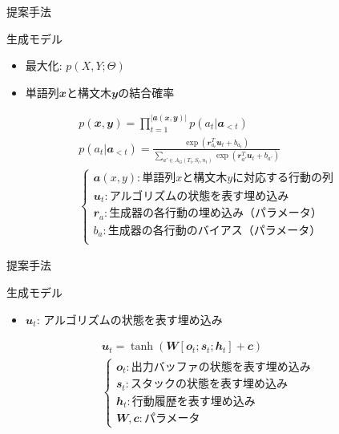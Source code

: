 \documentclass[aspectratio=43,unicode,10pt]{beamer}
\newcommand{\mb}{\mathbfit}
\begin{document}
\begin{frame}{提案手法}
  \begin{block}{生成モデル}
    \begin{itemize}
      \item 最大化: $p(X, Y; \Theta)$
      \item 単語列$\mb{x}$と構文木$\mb{y}$の結合確率
    \end{itemize}
    \begin{gather*}
      p(\mb{x}, \mb{y}) = \prod_{t=1}^{|\mb{a}(\mb{x}, \mb{y})|}
                          p(a_t | \mb{a}_{<t}) \\
      p(a_t | \mb{a}_{<t})
      = \frac{\exp (\mb{r}_{a_t}^T \mb{u}_t + b_{a_t})}
        {\sum_{a' \in A_G(T_t, S_t, n_t)}
         \exp (\mb{r}_{a'}^T \mb{u}_t + b_{a'})} \\
      \begin{cases}
        \mb{a}(x, y): \text{単語列$x$と構文木$y$に対応する行動の列} \\
        \mb{u}_t: \text{アルゴリズムの状態を表す埋め込み} \\
        \mb{r}_a: \text{生成器の各行動の埋め込み（パラメータ）} \\
        b_a: \text{生成器の各行動のバイアス（パラメータ）} \\
      \end{cases}
    \end{gather*}
  \end{block}
\end{frame}

\begin{frame}{提案手法}
  \begin{block}{生成モデル}
    \begin{itemize}
      \item $\mb{u}_t$: アルゴリズムの状態を表す埋め込み
    \end{itemize}
    \begin{gather*}
      \mb{u}_t = \tanh (\mb{W}[\mb{o}_t; \mb{s}_t; \mb{h}_t] + \mb{c}) \\
      \begin{cases}
        \mb{o}_t: \text{出力バッファの状態を表す埋め込み} \\
        \mb{s}_t: \text{スタックの状態を表す埋め込み} \\
        \mb{h}_t: \text{行動履歴を表す埋め込み} \\
        \mb{W}, \mb{c}: \text{パラメータ}
      \end{cases}
    \end{gather*}
  \end{block}
\end{frame}
\end{document}

